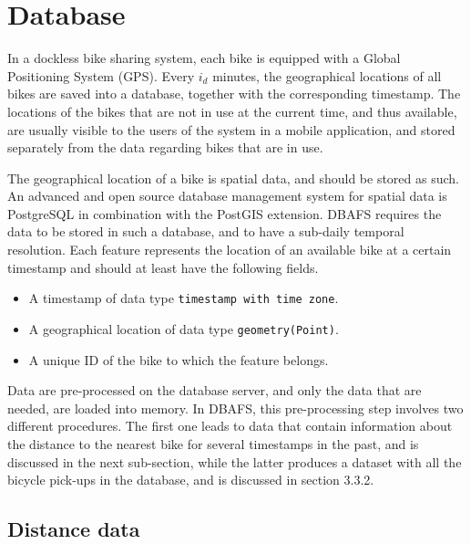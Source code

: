 \documentclass[12pt,oneside]{reedthesis}
\providecommand{\tightlist}{%
  \setlength{\itemsep}{0pt}\setlength{\parskip}{0pt}}
\begin{document}
\section{Database}\label{database}

In a dockless bike sharing system, each bike is equipped with a Global
Positioning System (GPS). Every \(i_{d}\) minutes, the geographical
locations of all bikes are saved into a database, together with the
corresponding timestamp. The locations of the bikes that are not in use
at the current time, and thus available, are usually visible to the
users of the system in a mobile application, and stored separately from
the data regarding bikes that are in use.

The geographical location of a bike is spatial data, and should be
stored as such. An advanced and open source database management system
for spatial data is PostgreSQL in combination with the PostGIS
extension. DBAFS requires the data to be stored in such a database, and
to have a sub-daily temporal resolution. Each feature represents the
location of an available bike at a certain timestamp and should at least
have the following fields.
\begin{itemize}
\tightlist
\item
  A timestamp of data type \texttt{timestamp\ with\ time\ zone}.
\item
  A geographical location of data type \texttt{geometry(Point)}.
\item
  A unique ID of the bike to which the feature belongs.
\end{itemize}
Data are pre-processed on the database server, and only the data that
are needed, are loaded into memory. In DBAFS, this pre-processing step
involves two different procedures. The first one leads to data that
contain information about the distance to the nearest bike for several
timestamps in the past, and is discussed in the next sub-section, while
the latter produces a dataset with all the bicycle pick-ups in the
database, and is discussed in section 3.3.2.

\subsection{Distance data}\label{distance-data}
\end{document}
